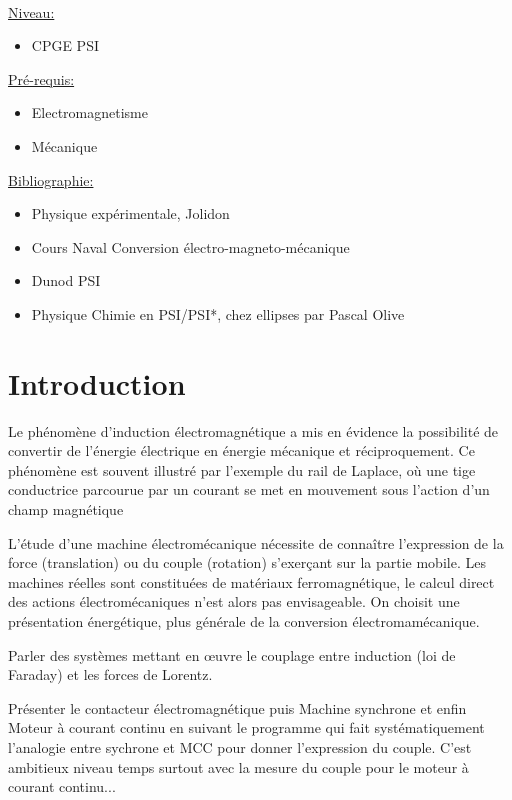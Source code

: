 \documentclass[french, a4paper, 10pt, twocolumn, landscape]{article}
\begin{document}
\hrulefill\\
	\underline{Niveau:}
	\begin{itemize}
		\item CPGE PSI
	\end{itemize}
	\underline{Pré-requis:} 
	\begin{itemize}
        \item Electromagnetisme
		\item Mécanique
	\end{itemize}
	\uline{Bibliographie:}
	\begin{itemize}
		\item Physique expérimentale, Jolidon
		\item Cours Naval Conversion électro-magneto-mécanique
		\item Dunod PSI
		\item Physique Chimie en PSI/PSI*, chez ellipses par Pascal Olive
	\end{itemize}
\hrulefill

\section*{Introduction}
Le phénomène d’induction électromagnétique a mis en évidence la possibilité
de convertir de l’énergie électrique en énergie mécanique et réciproquement. Ce phénomène est souvent illustré par l'exemple du rail de Laplace, où une tige conductrice parcourue par un courant se met en mouvement sous l'action d'un champ magnétique\medskip

L’étude d’une machine électromécanique nécessite de connaître l’expression de
la force (translation) ou du couple (rotation) s’exerçant sur la partie mobile. Les
machines réelles sont constituées de matériaux ferromagnétique, le calcul direct des
actions électromécaniques n’est alors pas envisageable. On choisit une présentation énergétique, plus générale de la conversion électromamécanique.\medskip

Parler des systèmes mettant en \oe uvre le couplage entre induction (loi de Faraday) et les forces de Lorentz. \medskip

Présenter le contacteur électromagnétique puis Machine synchrone et enfin Moteur à courant continu en suivant le programme qui fait systématiquement l'analogie entre sychrone et MCC pour donner l'expression du couple. C'est ambitieux niveau temps surtout avec la mesure du couple pour le moteur à courant continu...
\end{document}
